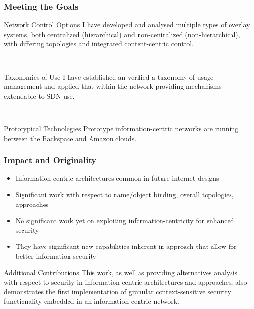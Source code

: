 \documentclass[t,handout]{beamer}
\begin{document}
\begin{frame}
\frametitle{Meeting the Goals}
\begin{beamerboxesrounded}[shadow]{Network Control Options}
{\small I have developed and analysed multiple types of overlay systems, both centralized (hierarchical) and non-centralized (non-hierarchical), with differing topologies and integrated content-centric control.}
\end{beamerboxesrounded}
~\\
\begin{beamerboxesrounded}[shadow]{Taxonomies of Use}
{\small I have established an verified a taxonomy of usage management and applied that within the network providing mechanisms extendable to SDN use.}
\end{beamerboxesrounded}
~\\
\begin{beamerboxesrounded}[shadow]{Prototypical Technologies}
{\small Prototype information-centric networks are running between the Rackspace and Amazon clouds.}
\end{beamerboxesrounded}
\end{frame}

\begin{frame}
\frametitle{Impact and Originality}
\begin{itemize}
\item Information-centric architectures common in future internet designs
\item Significant work with respect to name/object binding, overall topologies, approaches
\item No significant work yet on exploiting information-centricity for enhanced security
\item They have significant new capabilities inherent in approach that allow for better information security
\end{itemize}
\begin{beamerboxesrounded}[shadow]{Additional Contributions}
{\small This work, as well as providing alternatives analysis with respect to security in information-centric architectures and approaches, also demonstrates the first implementation of granular context-sensitive security functionality embedded in an information-centric network.}
\end{beamerboxesrounded}
\end{frame}
\end{document}
